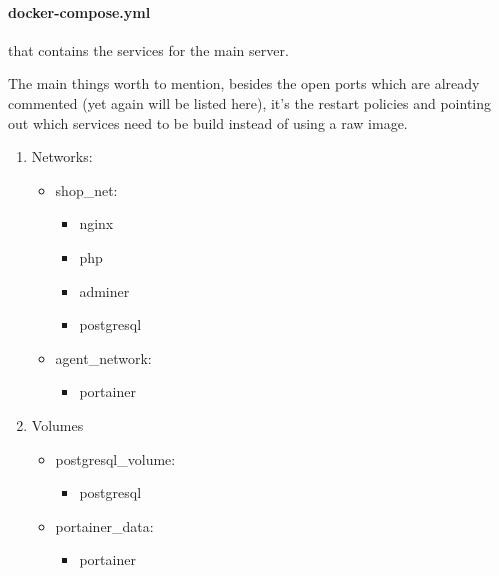     \paragraph{docker-compose.yml} that contains the services for the main server.
    \newpage
    \begin{flushleft}
        The main things worth to mention, besides the open ports which are already commented (yet again will be listed here),
        it's the restart policies and pointing out which services need to be build instead of using a raw image.
    \end{flushleft}
    \begin{enumerate}
        \item Networks:
            \begin{itemize}
                \item shop\_net:
                \begin{itemize}
                    \item nginx
                    \item php
                    \item adminer
                    \item postgresql
                \end{itemize}
                \item agent\_network:
                \begin{itemize}
                    \item portainer
                \end{itemize}
            \end{itemize}
        \item Volumes
            \begin{itemize}
                \item postgresql\_volume:
                \begin{itemize}
                      \item postgresql
                \end{itemize}
                \item portainer\_data:
                \begin{itemize}
                      \item portainer
                \end{itemize}
            \end{itemize}

    \end{enumerate}

